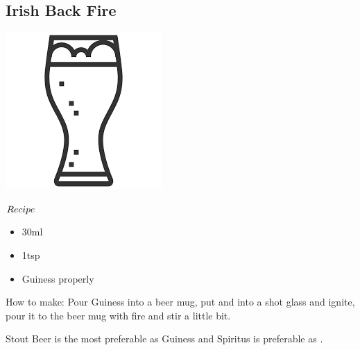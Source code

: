 \subsection{Irish Back Fire}
\vspace{-7.5mm}
\hspace{44mm}
\includegraphics[scale=.06]{tumbler.png}
\vspace{2.5mm}
\begin{itembox}[l]{\boldmath $Recipe$}
\begin{itemize}
\setlength{\parskip}{0cm}
\setlength{\itemsep}{0cm}
\item \vodka 30ml
\item \cc 1tsp
\item Guiness \beer properly
\end{itemize}
\vspace{-4mm}
How to make: Pour Guiness \beer into a beer mug, put \vodka and \cc into a shot glass and ignite, pour it to the beer mug with fire and stir a little bit.
\end{itembox}
Stout Beer is the most preferable as Guiness \beer and Spiritus is preferable as \vodka
\hspace{-1mm}.
